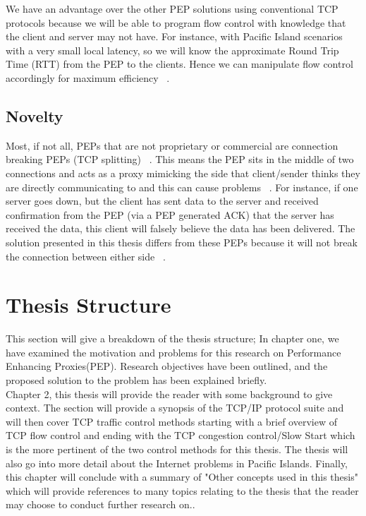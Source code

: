 We have an advantage over the other PEP solutions using conventional TCP protocols because we will be able to program flow control with knowledge that the client and server may not have. For instance, with Pacific Island scenarios with a very small local latency, so we will know the approximate Round Trip Time (RTT) from the PEP to the clients. Hence we can manipulate flow control accordingly for maximum efficiency ~\cite{4}.

\subsection{Novelty}\label{Novelty} 
Most, if not all, PEPs that are not proprietary or commercial are connection breaking PEPs (TCP splitting) ~\cite{6}. This means the PEP sits in the middle of two connections and acts as a proxy mimicking the side that client/sender thinks they are directly communicating to and this can cause problems ~\cite{6}. For instance, if one server goes down, but the client has sent data to the server and received confirmation from the PEP (via a PEP generated ACK) that the server has received the data, this client will falsely believe the data has been delivered. The solution presented in this thesis differs from these PEPs because it will not break the connection between either side ~\cite{6}. 

\section{Thesis Structure}\label{Structure}
This section will give a breakdown of the thesis structure; In chapter one, we have examined the motivation and problems for this research on Performance Enhancing Proxies(PEP). Research objectives have been outlined, and the proposed solution to the problem has been explained briefly. \\

Chapter 2, this thesis will provide the reader with some background to give context. The section will provide a synopsis of the TCP/IP protocol suite and will then cover TCP traffic control methods starting with a brief overview of TCP flow control and ending with the TCP congestion control/Slow Start which is the more pertinent of the two control methods for this thesis. The thesis will also go into more detail about the Internet problems in Pacific Islands. Finally, this chapter will conclude with a summary of "Other concepts used in this thesis" which will provide references to many topics relating to the thesis that the reader may choose to conduct further research on..  \\

